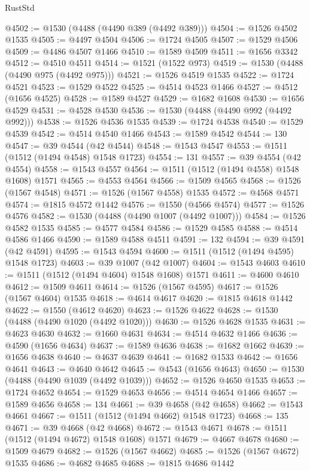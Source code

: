 \begin{lexlean}{RustStd}
\begin{coremodule}
{{@4502 := @1530 (@4488 (@4490 @389 (@4492 @389)))
@4504 := @1526 @4502 @1535
@4505 := @4497 @4504
@4506 := @1724 @4505
@4507 := @1529 @4506
@4509 := @4486 @4507 @1466
@4510 := @1589 @4509
@4511 := @1656 @3342
@4512 := @4510 @4511
@4514 := @1521 (@1522 @973)
@4519 := @1530 (@4488 (@4490 @975 (@4492 @975)))
@4521 := @1526 @4519 @1535
@4522 := @1724 @4521
@4523 := @1529 @4522
@4525 := @4514 @4523 @1466
@4527 := @4512 (@1656 @4525)
@4528 := @1589 @4527
@4529 := @1682 @1608
@4530 := @1656 @4529
@4531 := @4528 @4530
@4536 := @1530 (@4488 (@4490 @992 (@4492 @992)))
@4538 := @1526 @4536 @1535
@4539 := @1724 @4538
@4540 := @1529 @4539
@4542 := @4514 @4540 @1466
@4543 := @1589 @4542
@4544 := 130
@4547 := @39 @4544 (@42 @4544)
@4548 := @1543 @4547
@4553 := @1511 (@1512 (@1494 @4548) @1548 @1723)
@4554 := 131
@4557 := @39 @4554 (@42 @4554)
@4558 := @1543 @4557
@4564 := @1511 (@1512 (@1494 @4558) @1548 @1608) @1571
@4565 := @4553 @4564
@4566 := @1509 @4565
@4568 := @1526 (@1567 @4548)
@4571 := @1526 (@1567 @4558) @1535
@4572 := @4568 @4571
@4574 := @1815 @4572 @1442
@4576 := @1550 (@4566 @4574)
@4577 := @1526 @4576
@4582 := @1530 (@4488 (@4490 @1007 (@4492 @1007)))
@4584 := @1526 @4582 @1535
@4585 := @4577 @4584
@4586 := @1529 @4585
@4588 := @4514 @4586 @1466
@4590 := @1589 @4588 @4511
@4591 := 132
@4594 := @39 @4591 (@42 @4591)
@4595 := @1543 @4594
@4600 := @1511 (@1512 (@1494 @4595) @1548 @1723)
@4603 := @39 @1007 (@42 @1007)
@4604 := @1543 @4603
@4610 := @1511 (@1512 (@1494 @4604) @1548 @1608) @1571
@4611 := @4600 @4610
@4612 := @1509 @4611
@4614 := @1526 (@1567 @4595)
@4617 := @1526 (@1567 @4604) @1535
@4618 := @4614 @4617
@4620 := @1815 @4618 @1442
@4622 := @1550 (@4612 @4620)
@4623 := @1526 @4622
@4628 := @1530 (@4488 (@4490 @1020 (@4492 @1020)))
@4630 := @1526 @4628 @1535
@4631 := @4623 @4630
@4632 := @1660 @4631
@4634 := @4514 @4632 @1466
@4636 := @4590 (@1656 @4634)
@4637 := @1589 @4636
@4638 := @1682 @1662
@4639 := @1656 @4638
@4640 := @4637 @4639
@4641 := @1682 @1533
@4642 := @1656 @4641
@4643 := @4640 @4642
@4645 := @4543 (@1656 @4643)
@4650 := @1530 (@4488 (@4490 @1039 (@4492 @1039)))
@4652 := @1526 @4650 @1535
@4653 := @1724 @4652
@4654 := @1529 @4653
@4656 := @4514 @4654 @1466
@4657 := @1589 @4656
@4658 := 134
@4661 := @39 @4658 (@42 @4658)
@4662 := @1543 @4661
@4667 := @1511 (@1512 (@1494 @4662) @1548 @1723)
@4668 := 135
@4671 := @39 @4668 (@42 @4668)
@4672 := @1543 @4671
@4678 := @1511 (@1512 (@1494 @4672) @1548 @1608) @1571
@4679 := @4667 @4678
@4680 := @1509 @4679
@4682 := @1526 (@1567 @4662)
@4685 := @1526 (@1567 @4672) @1535
@4686 := @4682 @4685
@4688 := @1815 @4686 @1442
}}
\end{coremodule}
\end{lexlean}

